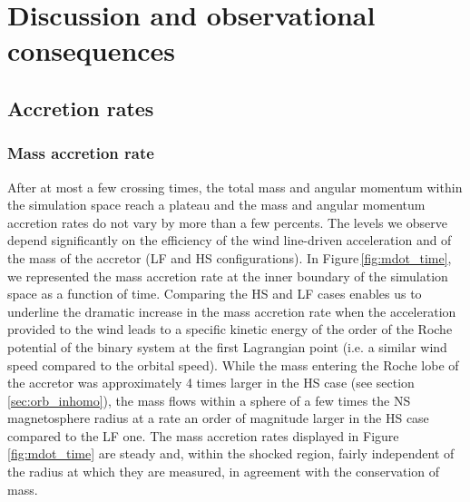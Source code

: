 \documentclass{aa}
\makeatletter
\newcommand*{\ns}{NS\@\xspace}
\newcommand*{\ie}{i.e.\@\xspace}
\makeatother
\begin{document}
%
%

\section{Discussion and observational consequences}
\label{sec:obs_cons}

\subsection{Accretion rates}
\label{sec:mdot_ldot}

\subsubsection{Mass accretion rate}
\label{sec:mdot}

After at most a few crossing times, the total mass and angular momentum within the simulation space reach a plateau and the mass and angular momentum accretion rates do not vary by more than a few percents. The levels we observe depend significantly on the efficiency of the wind line-driven acceleration and of the mass of the accretor (LF and HS configurations). In Figure\,\ref{fig:mdot_time}, we represented the mass accretion rate at the inner boundary of the simulation space as a function of time. Comparing the HS and LF cases enables us to underline the dramatic increase in the mass accretion rate when the acceleration provided to the wind leads to a specific kinetic energy of the order of the Roche potential of the binary system at the first Lagrangian point (\ie a similar wind speed compared to the orbital speed). While the mass entering the Roche lobe of the accretor was approximately 4 times larger in the HS case (see section\,\ref{sec:orb_inhomo}), the mass flows within a sphere of a few times the \ns magnetosphere radius at a rate an order of magnitude larger in the HS case compared to the LF one. The mass accretion rates displayed in Figure\,\ref{fig:mdot_time} are steady and, within the shocked region, fairly independent of the radius at which they are measured, in agreement with the conservation of mass.
\end{document}
